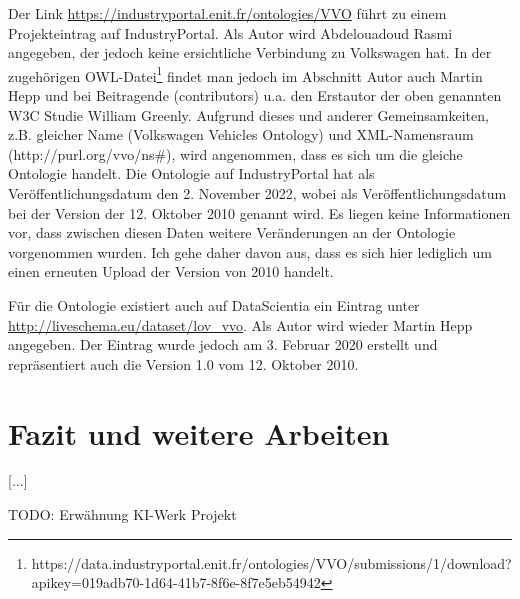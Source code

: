 \documentclass{article}
\begin{document}
Der Link \url{https://industryportal.enit.fr/ontologies/VVO} führt zu einem Projekteintrag auf IndustryPortal.
Als Autor wird Abdelouadoud Rasmi angegeben, der jedoch keine ersichtliche Verbindung zu Volkswagen hat.
In der zugehörigen OWL-Datei\footnote{https://data.industryportal.enit.fr/ontologies/VVO/submissions/1/download?apikey=019adb70-1d64-41b7-8f6e-8f7e5eb54942} findet man jedoch im Abschnitt Autor auch Martin Hepp und bei Beitragende (contributors) u.a. den Erstautor der oben genannten W3C Studie William Greenly.
Aufgrund dieses und anderer Gemeinsamkeiten, z.B. gleicher Name (Volkswagen Vehicles Ontology) und XML-Namensraum (http://purl.org/vvo/ns\#), wird angenommen, dass es sich um die gleiche Ontologie handelt. Die Ontologie auf IndustryPortal hat als Veröffentlichungsdatum den 2. November 2022, wobei als Veröffentlichungsdatum bei der Version der 12. Oktober 2010 genannt wird.
Es liegen keine Informationen vor, dass zwischen diesen Daten weitere Veränderungen an der Ontologie vorgenommen wurden.
Ich gehe daher davon aus, dass es sich hier lediglich um einen erneuten Upload der Version von 2010 handelt.

Für die Ontologie existiert auch auf DataScientia ein Eintrag unter \url{http://liveschema.eu/dataset/lov\_vvo}.
Als Autor wird wieder Martin Hepp angegeben.
Der Eintrag wurde jedoch am 3. Februar 2020 erstellt und repräsentiert auch die Version 1.0 vom 12. Oktober 2010.


\section{Fazit und weitere Arbeiten}

[...]

TODO: Erwähnung KI-Werk Projekt



\medskip

\printbibliography
\end{document}
